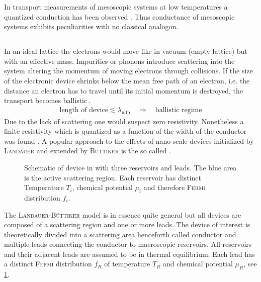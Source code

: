 In transport measurements of mesoscopic systems at low temperatures a quantized conduction has been observed \cite{PhysRevLett.45.494}. Thus conductance of mesoscopic systems exhibits peculiarities with no classical analogon.
\subsection{\clanbform{}}\label{sec:landauerbuettiker}
In an ideal lattice the electrons would move like in vacuum (empty lattice) but with an effective mass. Impurities or phonons introduce scattering into the system altering the momentum of moving electrons through collisions.
If the size of the electronic device shrinks below the mean free path of an electron, i.e. the distance an electron has to travel until its initial momentum is destroyed, the transport becomes ballistic\,\cite{datta1989quantum}. 
\begin{align}
	\text{length of device} \lesssim \lambda_{\text{mfp}}\quad \Rightarrow \quad\text{ballistic regime}
	\label{eqn:meanfreepath}
\end{align}
Due to the lack of scattering one would suspect zero resistivity. Nonetheless a finite resistivity which is quantized as a function of the width of the conductor was found \cite{PhysRevLett.60.848}.
A popular approach to the effects of nano-scale devices initialized by \textsc{Landauer} \cite{PhilMag.21.863} and extended by \textsc{B\"uttiker} is the so called \lanbform{} \cite{PhysRevB.31.6207}.
\begin{figure}[h]
\centering
{}
\caption{Schematic of device in \lanbform{} with three reservoirs and leads. The blue area is the active scattering region. Each reservoir has distinct Temperature $T_i$, chemical potential $\mu_i$ and therefore \textsc{Fermi} distribution $f_i$.}
\label{fig:lanbform}
\end{figure}
The \textsc{Landauer-B\"uttiker} model is in essence quite general but all devices are composed of a scattering region and one or more leads. The device of interest is theoretically divided into a scattering area henceforth called conductor and multiple leads connecting the conductor to macroscopic reservoirs. All reservoirs and their adjacent leads are assumed to be in thermal equilibrium. Each lead has a distinct \textsc{Fermi} distribution $f_R$ of temperature $T_R$ and chemical potential $\mu_R$, see \cref{fig:lanbform}.
